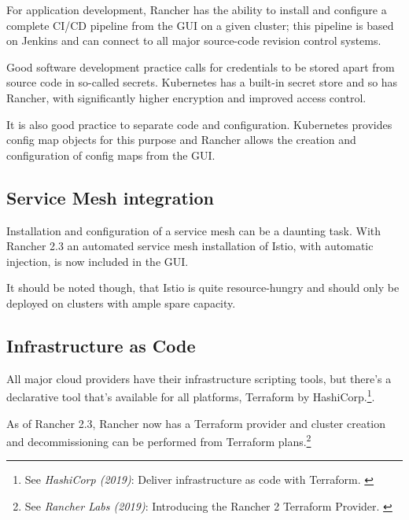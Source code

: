 For application development, Rancher has the ability to install and configure a complete CI/CD pipeline from the GUI on a given cluster; this pipeline is based on Jenkins and can connect to all major source-code revision control systems.

Good software development practice calls for credentials to be stored apart from source code in so-called secrets. Kubernetes has a built-in secret store and so has Rancher, with significantly higher encryption and improved access control.

It is also good practice to separate code and configuration. Kubernetes provides config map objects for this purpose and Rancher allows the creation and configuration of config maps from the GUI.

\subsection{Service Mesh integration}

Installation and configuration of a service mesh can be a daunting task. With Rancher 2.3 an automated service mesh installation of Istio, with automatic injection, is now included in the GUI.

It should be noted though, that Istio is quite resource-hungry and should only be deployed on clusters with ample spare capacity.

\subsection{Infrastructure as Code}

All major cloud providers have their infrastructure scripting tools, but there's a declarative tool that's available for all platforms, Terraform by HashiCorp.\footnote{See \textit{HashiCorp (2019)}: Deliver infrastructure as code with Terraform. \cite{terraform}}.

As of Rancher 2.3, Rancher now has a Terraform provider and cluster creation and decommissioning can be performed from Terraform plans.\footnote{See \textit{Rancher Labs (2019)}: Introducing the Rancher 2 Terraform Provider. \cite{terraformProvider}}
